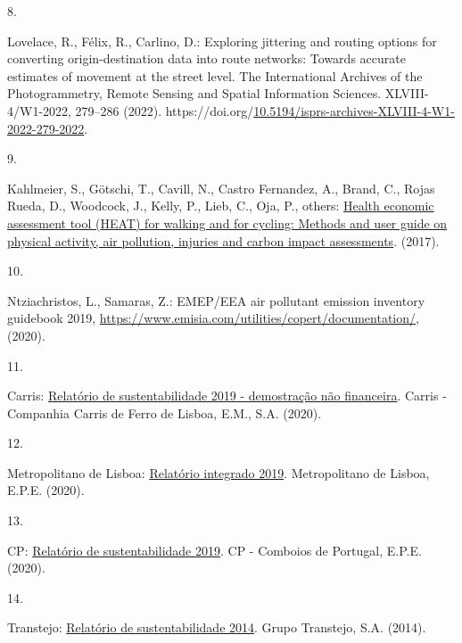 \documentclass[runningheads]{llncs}
\newlength{\cslhangindent}
\newlength{\csllabelwidth}
\newlength{\cslentryspacingunit} %
\newenvironment{CSLReferences}[2] %
 {%
  \setlength{\parindent}{0pt}
  \ifodd #1
  \let\oldpar\par
  \def\par{\hangindent=\cslhangindent\oldpar}
  \fi
  \setlength{\parskip}{#2\cslentryspacingunit}
 }%
 {}
\newcommand{\CSLLeftMargin}[1]{\parbox[t]{\csllabelwidth}{#1}}
\newcommand{\CSLRightInline}[1]{\parbox[t]{\linewidth - \csllabelwidth}{#1}\break}
\begin{document}
\begin{CSLReferences}{0}{0}
\leavevmode{}%
\CSLLeftMargin{8. }%
\CSLRightInline{Lovelace, R., Félix, R., Carlino, D.: Exploring
jittering and routing options for converting origin-destination data
into route networks: Towards accurate estimates of movement at the
street level. The International Archives of the Photogrammetry, Remote
Sensing and Spatial Information Sciences. XLVIII-4/W1-2022, 279--286
(2022).
https://doi.org/\href{https://doi.org/10.5194/isprs-archives-XLVIII-4-W1-2022-279-2022}{10.5194/isprs-archives-XLVIII-4-W1-2022-279-2022}.}

\leavevmode{}%
\CSLLeftMargin{9. }%
\CSLRightInline{Kahlmeier, S., Götschi, T., Cavill, N., Castro
Fernandez, A., Brand, C., Rojas Rueda, D., Woodcock, J., Kelly, P.,
Lieb, C., Oja, P., others:
\href{https://www.euro.who.int/__data/assets/pdf_file/0010/352963/Heat.pdf}{Health
economic assessment tool ({HEAT}) for walking and for cycling: Methods
and user guide on physical activity, air pollution, injuries and carbon
impact assessments}. (2017).}

\leavevmode{}%
\CSLLeftMargin{10. }%
\CSLRightInline{Ntziachristos, L., Samaras, Z.: {EMEP/EEA} air pollutant
emission inventory guidebook 2019,
\url{https://www.emisia.com/utilities/copert/documentation/}, (2020).}

\leavevmode{}%
\CSLLeftMargin{11. }%
\CSLRightInline{Carris:
\href{https://www.carris.pt/media/dkdp2wbg/dnf_carris2019_rv5.pdf}{Relatório
de sustentabilidade 2019 - demostração não financeira}. {Carris -
Companhia Carris de Ferro de Lisboa, E.M., S.A.} (2020).}

\leavevmode{}%
\CSLLeftMargin{12. }%
\CSLRightInline{Metropolitano de Lisboa:
\href{https://www.metrolisboa.pt/wp-content/uploads/2021/01/relatorio_integrado_2019.pdf}{Relatório
integrado 2019}. {Metropolitano de Lisboa, E.P.E.} (2020).}

\leavevmode{}%
\CSLLeftMargin{13. }%
\CSLRightInline{CP:
\href{https://www.cp.pt/StaticFiles/Institucional/2_gestao_sustentavel/1_RelatoriosSustentabilidade/relatorio-de-sustentabilidade-2019.pdf}{Relatório
de sustentabilidade 2019}. {CP - Comboios de Portugal, E.P.E.} (2020).}

\leavevmode{}%
\CSLLeftMargin{14. }%
\CSLRightInline{Transtejo:
\href{https://ttsl.pt/wp-content/uploads/2018/01/rs_2014_min.pdf}{Relatório
de sustentabilidade 2014}. {Grupo Transtejo, S.A.} (2014).}


\end{CSLReferences}
\end{document}

